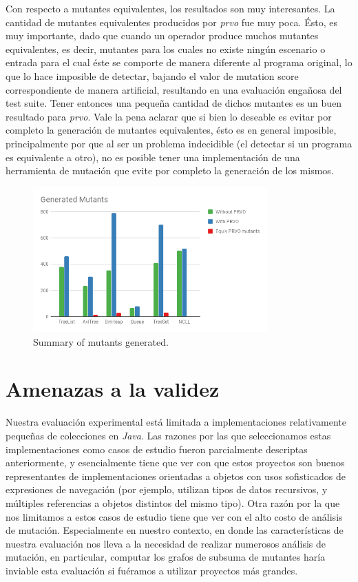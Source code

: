 Con respecto a mutantes equivalentes, los resultados son muy interesantes. La cantidad de mutantes equivalentes producidos por \emph{prvo} fue muy poca. \'Esto, es muy importante, dado que cuando un operador produce muchos mutantes equivalentes, es decir, mutantes para los cuales no existe ning\'un escenario o entrada para el cual \'este se comporte de manera diferente al programa original, lo que lo hace imposible de detectar, bajando el valor de mutation score correspondiente de manera artificial, resultando en una evaluaci\'on enga\~nosa del test suite. Tener entonces una peque\~na cantidad de dichos mutantes es un buen resultado para \emph{prvo}. Vale la pena aclarar que si bien lo deseable es evitar por completo la generaci\'on de mutantes equivalentes, \'esto es en general imposible, principalmente por que al ser un problema indecidible (el detectar si un programa es equivalente a otro), no es posible tener una implementaci\'on de una herramienta de mutaci\'on que evite por completo la generaci\'on de los mismos.

\begin{figure}[t]
	\begin{center}
		\includegraphics[width=9cm]{figures/Generated_Mutants.png}
	\end{center}
	\caption{Summary of mutants generated.}
	\label{mutants-results}
\end{figure}


\section{Amenazas a la validez}

Nuestra evaluaci\'on experimental est\'a limitada a implementaciones relativamente peque\~nas de colecciones en \emph{Java}. Las razones por las que seleccionamos estas implementaciones como casos de estudio fueron parcialmente descriptas anteriormente, y esencialmente tiene que ver con que estos proyectos son buenos representantes de implementaciones orientadas a objetos con usos sofisticados de expresiones de navegaci\'on (por ejemplo, utilizan tipos de datos recursivos, y m\'ultiples referencias a objetos distintos del mismo tipo). Otra raz\'on por la que nos limitamos a estos casos de estudio tiene que ver con el alto costo de an\'alisis de mutaci\'on. Especialmente en nuestro contexto, en donde las caracter\'isticas de nuestra evaluaci\'on nos lleva a la necesidad de realizar numerosos an\'alisis de mutaci\'on, en particular, computar los grafos de subsuma de mutantes har\'ia inviable esta evaluaci\'on si fu\'eramos a utilizar proyectos m\'as grandes.


